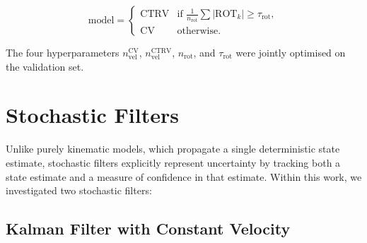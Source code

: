     \begin{equation}
        \text{model} =
        \begin{cases}
            \text{CTRV} & \text{if } \tfrac{1}{n_\text{rot}}\sum |\text{ROT}_k| \geq \tau_\text{rot}, \\
            \text{CV}   & \text{otherwise.}
        \end{cases}
        \label{eq:hybrid_condition}
    \end{equation}
    
    The four hyperparameters $n_{\text{vel}}^\text{CV}$,
    $n_{\text{vel}}^\text{CTRV}$, $n_\text{rot}$, and $\tau_\text{rot}$ were
    jointly optimised on the validation set.



\section{Stochastic Filters}
\label{sec:filterimplementation}

Unlike purely kinematic models, which propagate a single deterministic state estimate, stochastic filters explicitly represent uncertainty by tracking both a state estimate and a measure of confidence in that estimate. Within this work, we investigated two stochastic filters:

    
 
\subsection{Kalman Filter with Constant Velocity}
\label{sec:method-cv-kf}

